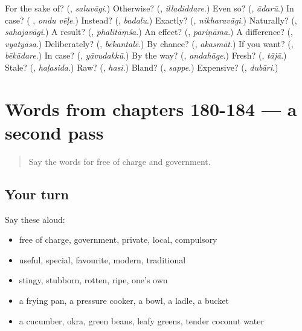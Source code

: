 \begin{tcolorbox}[breakable,colback=teal!4,colframe=teal!35!black,title={Before you move on}]
For the sake of? (\textbf{}, \emph{saluvāgi}.) Otherwise? (\textbf{}, \emph{illadiddare}.) Even so? (\textbf{}, \emph{ādarū}.) In case? (\textbf{ }, \emph{ondu vēḷe}.) Instead? (\textbf{}, \emph{badalu}.) Exactly? (\textbf{}, \emph{nikharavāgi}.) Naturally? (\textbf{}, \emph{sahajavāgi}.) A result? (\textbf{}, \emph{phalitāṃśa}.) An effect? (\textbf{}, \emph{pariṇāma}.) A difference? (\textbf{}, \emph{vyatyāsa}.) Deliberately? (\textbf{}, \emph{bēkantalē}.) By chance? (\textbf{}, \emph{akasmāt}.) If you want? (\textbf{}, \emph{bēkādare}.) In case? (\textbf{}, \emph{yāvudakkū}.) By the way? (\textbf{}, \emph{andahāge}.) Fresh? (\textbf{}, \emph{tājā}.) Stale? (\textbf{}, \emph{haḷasida}.) Raw? (\textbf{}, \emph{hasi}.) Bland? (\textbf{}, \emph{sappe}.) Expensive? (\textbf{}, \emph{dubāri}.)
\end{tcolorbox}
\section[(dialogue)]{Words from chapters 180-184 — a second pass}

\label{lesson:KA-R184-second-pass-words-from-chapters-180-184}



\begin{quote}
Say the words for free of charge and government.
\end{quote}

\subsection*{Your turn}
Say these aloud:

\begin{itemize}
\raggedright
  \item free of charge, government, private, local, compulsory
  \item useful, special, favourite, modern, traditional
  \item stingy, stubborn, rotten, ripe, one's own
  \item a frying pan, a pressure cooker, a bowl, a ladle, a bucket
  \item a cucumber, okra, green beans, leafy greens, tender coconut water
\end{itemize}

